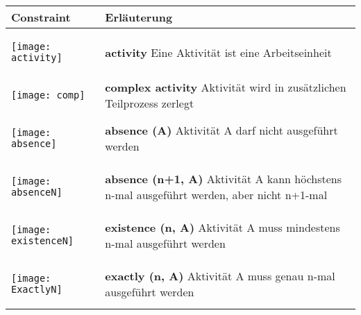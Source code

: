  \begin{longtable}{|p{}|p{}|}
\hline
\textbf{Constraint} & \textbf{Erläuterung}\\
\hline

\begin{center}
  \texttt{[image: activity]} %
  \end{center}
& \textbf{activity} \newline
Eine Aktivität ist eine Arbeitseinheit\\
\hline

\begin{center}
  \texttt{[image: comp]} %
  \end{center}
& \textbf{complex activity} \newline
Aktivität wird in zusätzlichen Teilprozess zerlegt\\
\hline


\begin{center}
  \texttt{[image: absence]} %
  \end{center}
& \textbf{absence (A)} \newline
Aktivität A darf nicht ausgeführt werden\\



\hline
\begin{center}

  \texttt{[image: absenceN]} %
    \end{center}

& \textbf{absence (n+1, A)} \newline
Aktivität A kann höchstens n-mal ausgeführt werden, aber nicht n+1-mal\\
\hline
\begin{center}

  \texttt{[image: existenceN]} %
    \end{center}

& \textbf{existence (n, A)}\newline
Aktivität A muss mindestens n-mal ausgeführt werden\\
\hline
\begin{center}

  \texttt{[image: ExactlyN]} %
    \end{center}

& \textbf{exactly (n, A)}\newline
Aktivität A muss genau n-mal ausgeführt werden\\
\hline


\end{longtable}

